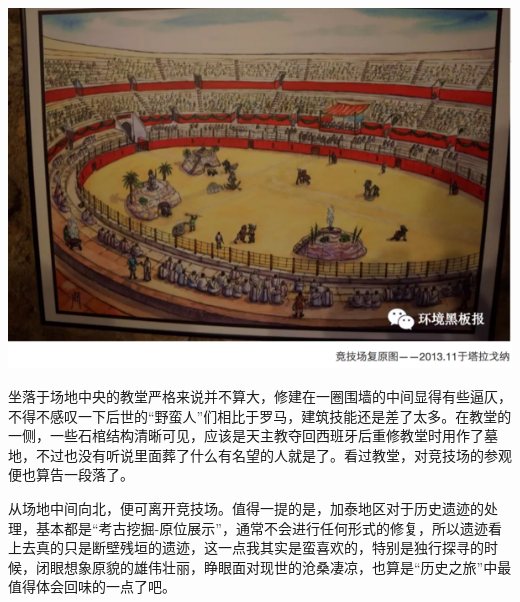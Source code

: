 \documentclass[
]{book}
\begin{document}
\includegraphics[width=8.33in]{images/xt30}

坐落于场地中央的教堂严格来说并不算大，修建在一圈围墙的中间显得有些逼仄，不得不感叹一下后世的``野蛮人''们相比于罗马，建筑技能还是差了太多。在教堂的一侧，一些石棺结构清晰可见，应该是天主教夺回西班牙后重修教堂时用作了墓地，不过也没有听说里面葬了什么有名望的人就是了。看过教堂，对竞技场的参观便也算告一段落了。

从场地中间向北，便可离开竞技场。值得一提的是，加泰地区对于历史遗迹的处理，基本都是``考古挖掘-原位展示''，通常不会进行任何形式的修复，所以遗迹看上去真的只是断壁残垣的遗迹，这一点我其实是蛮喜欢的，特别是独行探寻的时候，闭眼想象原貌的雄伟壮丽，睁眼面对现世的沧桑凄凉，也算是``历史之旅''中最值得体会回味的一点了吧。
\end{document}
